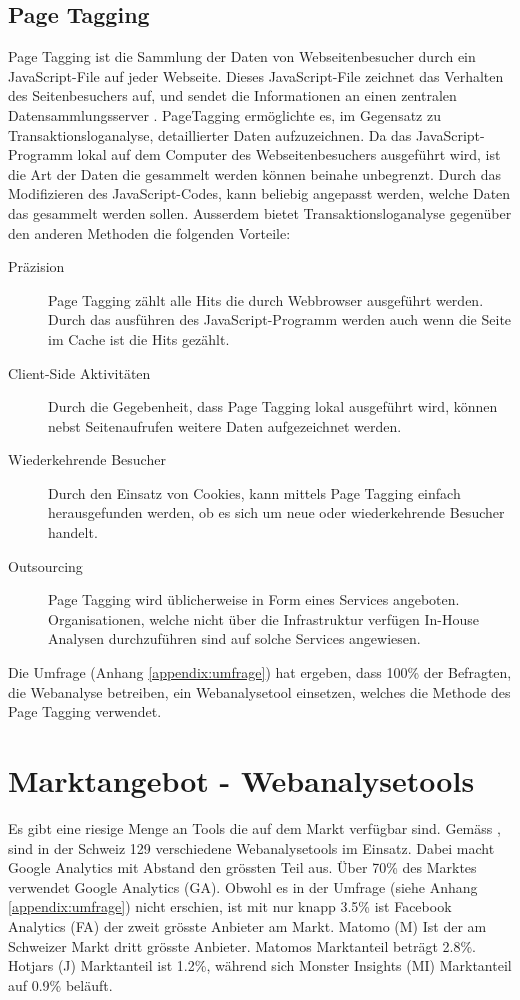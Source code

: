 \subsection{Page Tagging} 
Page Tagging ist die Sammlung der Daten von Webseitenbesucher durch ein JavaScript-File auf jeder Webseite. Dieses JavaScript-File zeichnet das Verhalten des Seitenbesuchers auf, und sendet die Informationen an einen zentralen Datensammlungsserver \parencite[S. 173]{nakatani2011toolselectionmethod}. PageTagging ermöglichte es, im Gegensatz zu Transaktionsloganalyse, detaillierter Daten aufzuzeichnen. Da das JavaScript-Programm lokal auf dem Computer des Webseitenbesuchers ausgeführt wird, ist die Art der Daten die gesammelt werden können beinahe unbegrenzt. Durch das Modifizieren des JavaScript-Codes, kann beliebig angepasst werden, welche Daten das gesammelt werden sollen. Ausserdem bietet Transaktionsloganalyse gegenüber den anderen Methoden die folgenden Vorteile\parencite[S. 174]{nakatani2011toolselectionmethod}:

\begin{description}
  \item[Präzision] Page Tagging zählt alle Hits die durch Webbrowser ausgeführt werden. Durch das ausführen des JavaScript-Programm werden auch wenn die Seite im Cache ist die Hits gezählt.
  \item[Client-Side Aktivitäten] Durch die Gegebenheit, dass Page Tagging lokal ausgeführt wird, können nebst Seitenaufrufen weitere Daten aufgezeichnet werden.
  \item[Wiederkehrende Besucher] Durch den Einsatz von Cookies, kann mittels Page Tagging einfach herausgefunden werden, ob es sich um neue oder wiederkehrende Besucher handelt.
  \item[Outsourcing] Page Tagging wird üblicherweise in Form eines Services angeboten. Organisationen, welche nicht über die Infrastruktur verfügen In-House Analysen durchzuführen sind auf solche Services angewiesen.
\end{description}

Die Umfrage (Anhang \ref{appendix:umfrage}) hat ergeben, dass 100\% der Befragten, die Webanalyse betreiben, ein Webanalysetool einsetzen, welches die Methode des Page Tagging verwendet.

\section{Marktangebot - Webanalysetools}
Es gibt eine riesige Menge an Tools die auf dem Markt verfügbar sind. Gemäss \parencite{datanyzeSwitzerlandWebanalytics}, sind in der Schweiz 129 verschiedene Webanalysetools im Einsatz. Dabei macht Google Analytics mit Abstand den grössten Teil aus. Über 70\% des Marktes verwendet Google Analytics (GA). Obwohl es in der Umfrage (siehe Anhang \ref{appendix:umfrage}) nicht erschien, ist mit nur knapp 3.5\% ist Facebook Analytics (FA) der zweit grösste Anbieter am Markt. Matomo (M) Ist der am Schweizer Markt dritt grösste Anbieter. Matomos Marktanteil beträgt 2.8\%. Hotjars (J) Marktanteil ist 1.2\%, während sich Monster Insights (MI) Marktanteil auf 0.9\% beläuft. 

